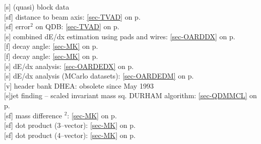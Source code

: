 [s] (quasi) block data\\
 [sf] distance to beam axis: \ref{sec-TVAD} on p.~\pageref{sec-TVAD}\\
 [sf] error$^2$ on QDB: \ref{sec-TVAD} on p.~\pageref{sec-TVAD}\\
 [s] combined dE/dx estimation using pads and wires: \ref{sec-OARDDX} on p.~\pageref{sec-OARDDX}\\
 [f] decay angle: \ref{sec-MK} on p.~\pageref{sec-MK}\\
 [f] decay angle: \ref{sec-MK} on p.~\pageref{sec-MK}\\
 [s] dE/dx analysis: \ref{sec-OARDEDX} on
 p.~\pageref{sec-OARDEDX}\\
 [s] dE/dx analysis (MCarlo datasets): \ref{sec-OARDEDM} on
 p.~\pageref{sec-OARDEDM}\\
 [v] header bank DHEA: obsolete since May 1993\\
 [s]jet finding -- scaled invariant mass sq. DURHAM algorithm:
 \ref{sec-QDMMCL} on p.~\pageref{sec-QDMMCL}\\
 [sf] mass difference $^2$: \ref{sec-MK} on p.~\pageref{sec-MK}\\
 [sf] dot product (3--vector): \ref{sec-MK} on p.~\pageref{sec-MK}\\
 [sf] dot product (4--vector): \ref{sec-MK} on p.~\pageref{sec-MK}
 
